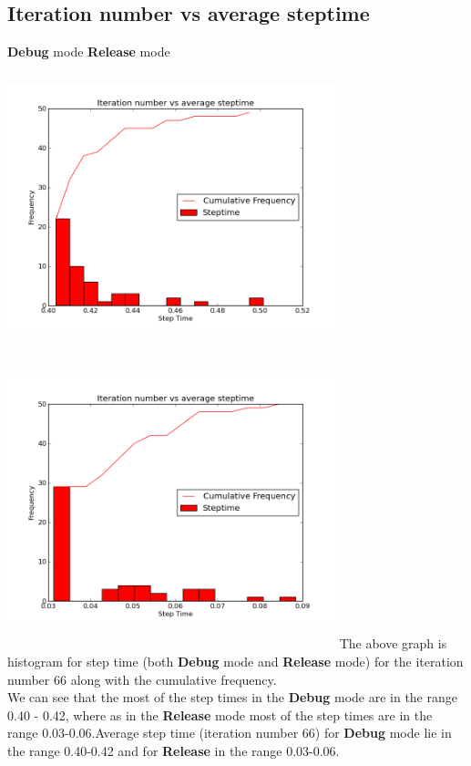 \documentclass{article}
\begin{document}
\subsection{Iteration number vs average steptime}
\textbf{Debug} mode \hfill \textbf{Release} mode\\
\includegraphics[width=270pt,height=240pt]{g27_lab09_plot04_debug} \hfill  
\includegraphics[width=270pt,height=240pt]{g27_lab09_plot04_release}
The above graph is histogram for step time (both \textbf{Debug} mode and \textbf{Release} mode) for the iteration number 66  along with the cumulative frequency.\\
We can see that the most of the step times in the \textbf{Debug} mode are in the range 0.40 - 0.42, where as in the \textbf{Release} mode most of the step times are in the range 0.03-0.06.Average step time (iteration number 66)  for \textbf{Debug} mode lie in the range 0.40-0.42 and for \textbf{Release} in the range 0.03-0.06.
\end{document}
